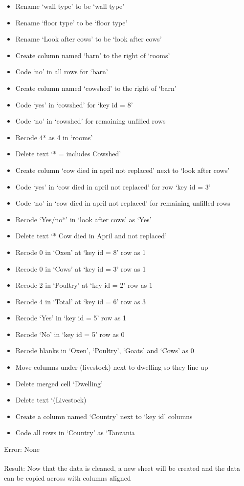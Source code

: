 \documentclass{article}
\begin{document}
\begin{itemize}
\item Rename ‘wall type’ to be ‘wall type’
\item Rename ‘floor type’ to be ‘floor type’
\item Rename ‘Look after cows’ to be ‘look after cows’
\item Create column named ‘barn’ to the right of ‘rooms’
\item Code ‘no’ in all rows for ‘barn’
\item Create column named ‘cowshed’ to the right of ‘barn’
\item Code ‘yes’ in ‘cowshed’ for ‘key id = 8’
\item Code ‘no’ in ‘cowshed’ for remaining unfilled rows
\item Recode 4* as 4 in ‘rooms’
\item Delete text ‘* = includes Cowshed’
\item Create column ‘cow died in april not replaced’ next to ‘look after cows’
\item Code ‘yes’ in ‘cow died in april not replaced’ for row ‘key id = 3’
\item Code ‘no’ in ‘cow died in april not replaced’ for remaining unfilled rows
\item Recode ‘Yes/no*’ in ‘look after cows’ as ‘Yes’
\item Delete text ‘* Cow died in April and not replaced’
\item Recode 0 in ‘Oxen’ at ‘key id = 8’ row as 1
\item Recode 0 in ‘Cows’ at ‘key id = 3’ row as 1
\item Recode 2 in ‘Poultry’ at ‘key id = 2’ row as 1
\item Recode 4 in ‘Total’ at ‘key id = 6’ row as 3
\item Recode ‘Yes’ in ‘key id = 5’ row as 1
\item Recode ‘No’ in ‘key id = 5’ row as 0
\item Recode blanks in ‘Oxen’, ‘Poultry’, ‘Goats’ and ‘Cows’ as 0
\item Move columns under (livestock) next to dwelling so they line up
\item Delete merged cell ‘Dwelling’
\item Delete text ‘(Livestock)
\item Create a column named ‘Country’ next to ‘key id’ columns
\item Code all rows in ‘Country’ as ‘Tanzania
\end{itemize}
Error: None \\\\
Result: Now that the data is cleaned, a new sheet will be created and the data can be copied across with columns aligned 
 
\end{document}

